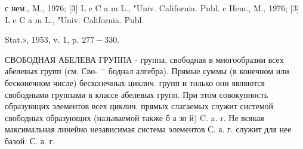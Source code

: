 \documentclass[10pt]{article}
\begin{document}
с нем., M., 1976; [3] L e $\mathrm{C}$ a m L., "Univ. California. Publ. c Hem., M., 1976; [3] L e C a m L., "Univ. California. Publ.

Stat.», 1953, v. 1, p. $277-330$.



СВОБОДНАЯ АБЕЛЕВА ГРУППА - группа, свободная в многообразии всех абелевых групп (см. Сво- $^{-}$ боднал алгебра). Прямые суммы (в конечном или бесконечном числе) бесконечных циклич. групп и только они являются свободными группами в классе абелевых групп. При этом совокупность образующих элементов всех циклич. прямых слагаемых служит системой свободных образующих (называемой также б а зо й) C. a. r. Не всякая максимальная линейно независимая система элементов С. а. г. служит для нее базой. С. а. г.
\end{document}

